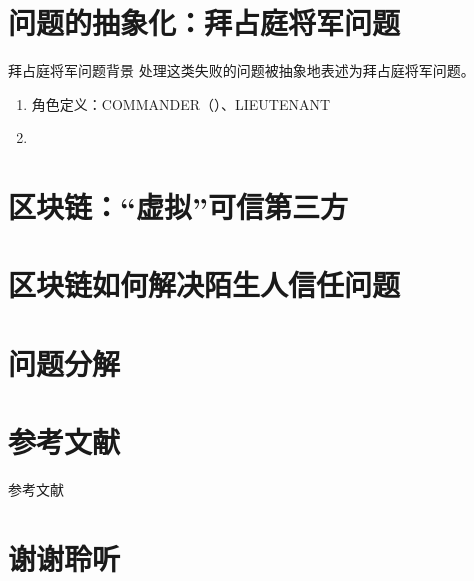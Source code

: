 \documentclass[11pt]{beamer}
\begin{document}
\section{问题的抽象化：拜占庭将军问题}

\begin{frame}{拜占庭将军问题背景}
	处理这类失败的问题被抽象地表述为拜占庭将军问题\cite{lamport_byzantine_1982}。
	\begin{enumerate}
		\item 角色定义：COMMANDER（）、LIEUTENANT
		\item 
	\end{enumerate}
\end{frame}

\section{区块链：“虚拟”可信第三方}

\section{区块链如何解决陌生人信任问题}

\section{问题分解}

\section{参考文献}
\begin{frame}{参考文献}
	\printbibliography
\end{frame}

\section*{谢谢聆听}
\end{document}
